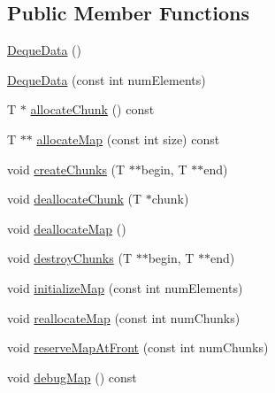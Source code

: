 \subsection*{Public Member Functions}
\begin{DoxyCompactItemize}
\item 
\hyperlink{classprism_1_1containers_1_1_deque_data_a6df573bc442a362759d91e5422134fe2}{Deque\+Data} ()
\item 
\hyperlink{classprism_1_1containers_1_1_deque_data_acfca954633c170f1a7fa7faacb013d6d}{Deque\+Data} (const int num\+Elements)
\item 
T $\ast$ \hyperlink{classprism_1_1containers_1_1_deque_data_a0ada47425797d68443f27823bfa08cea}{allocate\+Chunk} () const 
\item 
T $\ast$$\ast$ \hyperlink{classprism_1_1containers_1_1_deque_data_a269638b0bd962c93931c5898482b4f44}{allocate\+Map} (const int size) const 
\item 
void \hyperlink{classprism_1_1containers_1_1_deque_data_a850f8ec25965cf841dd64a97d2e77f40}{create\+Chunks} (T $\ast$$\ast$begin, T $\ast$$\ast$end)
\item 
void \hyperlink{classprism_1_1containers_1_1_deque_data_a6fdfcbf7075005a085405b7ec0ae210e}{deallocate\+Chunk} (T $\ast$chunk)
\item 
void \hyperlink{classprism_1_1containers_1_1_deque_data_aaae5b68eaa8045c9a299daf457fe2a1f}{deallocate\+Map} ()
\item 
void \hyperlink{classprism_1_1containers_1_1_deque_data_a688c8749c8ccab76a351192743c1d557}{destroy\+Chunks} (T $\ast$$\ast$begin, T $\ast$$\ast$end)
\item 
void \hyperlink{classprism_1_1containers_1_1_deque_data_ae17c6cb94116e58431aab0ca0d94b41e}{initialize\+Map} (const int num\+Elements)
\item 
void \hyperlink{classprism_1_1containers_1_1_deque_data_ab27311b60cdca11069661aa4a5233958}{reallocate\+Map} (const int num\+Chunks)
\item 
void \hyperlink{classprism_1_1containers_1_1_deque_data_a134621784e64e855754d187c4babd03c}{reserve\+Map\+At\+Front} (const int num\+Chunks)
\item 
void \hyperlink{classprism_1_1containers_1_1_deque_data_a66b8f37117266f764d5ea3f60ee4a948}{debug\+Map} () const 
\end{DoxyCompactItemize}
